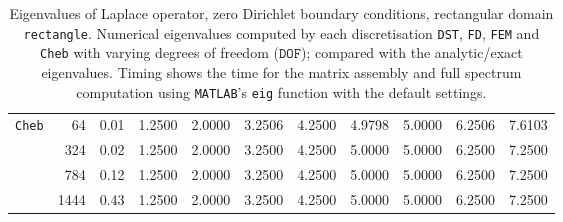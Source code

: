 \begin{table}[htbp]
{\begin{tabular}{lrrrrrrrrrr}
    \midrule
    \multirow{4}{*}{\texttt{Cheb}} & 64 & 0.01 & 1.2500 & 2.0000 & 3.2506 & 4.2500 & 4.9798 & 5.0000 & 6.2506 & 7.6103 \\
     & 324 & 0.02 & 1.2500 & 2.0000 & 3.2500 & 4.2500 & 5.0000 & 5.0000 & 6.2500 & 7.2500 \\
     & 784 & 0.12 & 1.2500 & 2.0000 & 3.2500 & 4.2500 & 5.0000 & 5.0000 & 6.2500 & 7.2500 \\
     & 1444 & 0.43 & 1.2500 & 2.0000 & 3.2500 & 4.2500 & 5.0000 & 5.0000 & 6.2500 & 7.2500 \\
    \bottomrule
  \end{tabular}}
  \caption{Eigenvalues of Laplace operator, zero Dirichlet boundary conditions, rectangular domain \texttt{rectangle}. Numerical eigenvalues computed by each discretisation \texttt{DST}, \texttt{FD}, \texttt{FEM} and \texttt{Cheb} with varying degrees of freedom ($\mathtt{DOF}$); compared with the analytic/exact eigenvalues. Timing shows the time for the matrix assembly and full spectrum computation using \texttt{MATLAB}'s \lstinline{eig} function with the default settings.}
  \label{tab:eigenvalues_head_rectangle}
\end{table}
